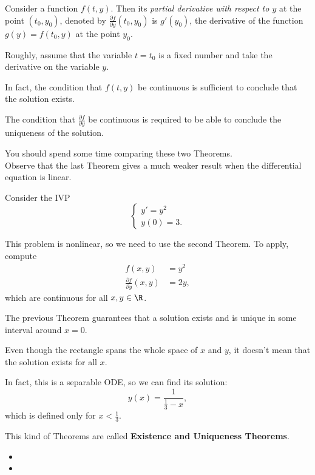 \begin{definition}
	Consider a function $f(t,y)$. Then its \emph{partial derivative with respect to $y$} at the point $(t_0,y_0)$, denoted by $\frac{\partial f}{\partial y}(t_0,y_0)$ is $g'(y_0)$, the derivative of the function $g(y)=f(t_0,y)$ at the point $y_0$.
	
	Roughly, assume that the variable $t=t_0$ is a fixed number and take the derivative on the variable $y$.
\end{definition}

\begin{graybox}
In fact, the condition that $f(t,y)$ be continuous is sufficient to conclude that the solution exists. 

The condition that $\frac{\partial f}{\partial y}$ be continuous is required to be able to conclude the uniqueness of the solution.
\end{graybox}


You should spend some time comparing these two Theorems. \\


Observe that the last Theorem gives a much weaker result when the differential equation is linear.


\begin{example}
Consider the IVP
$$
\begin{cases}
y'=y^2\\
y(0)=3.
\end{cases}
$$

This problem is nonlinear, so we need to use the second Theorem. To apply, compute
\begin{align*}
f(x,y) & = y^2 \\
\frac{\partial f}{\partial y}(x,y) & = 2y,
\end{align*}
which are continuous for all $x,y\in \R$.

The previous Theorem guarantees that a solution exists and is unique in some interval around $x=0$.

Even though the rectangle spans the whole space of $x$ and $y$, it doesn't mean that the solution exists for all $x$. %

In fact, this is a separable ODE, so we can find its solution:
$$
y(x) = \frac{1}{\frac13-x},
$$
which is defined only for $x<\frac13$.
\end{example}


\begin{graybox}
This kind of Theorems are called \textbf{\color{gray}Existence and Uniqueness Theorems}.
\end{graybox}



\begin{video}
\begin{itemize}
	\item {}
	\item {}
\end{itemize}	
\end{video}


